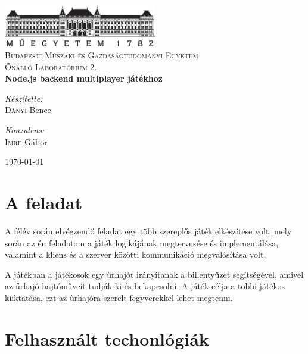 \documentclass[12pt]{article}
\begin{document}
\begin{titlepage}
  \begin{center}
    \includegraphics[width=0.5\textwidth]{figures/logo}~\\[1cm]
    \textsc{Budapesti Műszaki és Gazdaságtudományi Egyetem}
    \\[1.5cm]
    \textsc{\Large Önálló Laboratórium 2.}
    \\[1cm]
    { \huge \bfseries Node.js backend multiplayer játékhoz }
    \\[2cm]

    \noindent
    \begin{minipage}[t]{0.4\textwidth}
      \begin{flushleft}
        \large
        \emph{Készítette:}\\
        \textsc{Dányi} Bence
    \end{flushleft}
    \end{minipage}%
    \begin{minipage}[t]{0.4\textwidth}
      \begin{flushright}
        \large
        \emph{Konzulens:} \\
        \textsc{Imre} Gábor
      \end{flushright}
    \end{minipage}

    \vfill

    {\large \today}
  \end{center}
\end{titlepage}
\section{A feladat}

A félév során elvégzendő feladat egy több szereplős játék elkészítése volt,
mely során az én feladatom a játék logikájának megtervezése és implementálása,
valamint a kliens és a szerver közötti kommunikáció megvalósítása volt.

A játékban a játékosok egy űrhajót irányítanak a billentyűzet segítségével,
amivel az űrhajó hajtóműveit tudják ki és bekapcsolni.
A játék célja a többi játékos kiiktatása, ezt az űrhajóra szerelt fegyverekkel
lehet megtenni.

\section{Felhasznált techonlógiák}
\end{document}
